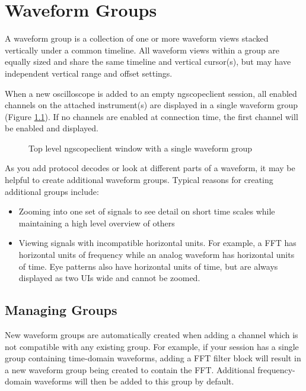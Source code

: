 \chapter{Waveform Groups}

A waveform group is a collection of one or more waveform views stacked vertically under a common timeline. All waveform
views within a group are equally sized and share the same timeline and vertical cursor(s), but may have independent
vertical range and offset settings.

When a new oscilloscope is added to an empty ngscopeclient session, all enabled channels on the attached instrument(s)
are displayed in a single waveform group (Figure \ref{single-group}). If no channels are enabled at connection time,
the first channel will be enabled and displayed.

\begin{figure}[h]
\centering
{}
\caption{Top level ngscopeclient window with a single waveform group}
\label{single-group}
\end{figure}

As you add protocol decodes or look at different parts of a waveform, it may be helpful to create additional waveform
groups. Typical reasons for creating additional groups include:

\begin{itemize}
\item Zooming into one set of signals to see detail on short time scales while maintaining a high level overview of
others
\item Viewing signals with incompatible horizontal units. For example, a FFT has horizontal units of frequency while an
analog waveform has horizontal units of time. Eye patterns also have horizontal units of time, but are always displayed
as two UIs wide and cannot be zoomed.
\end{itemize}

\section{Managing Groups}

New waveform groups are automatically created when adding a channel which is not compatible with any existing group.
For example, if your session has a single group containing time-domain waveforms, adding a FFT filter block will result
in a new waveform group being created to contain the FFT. Additional frequency-domain waveforms will then be added to
this group by default.


